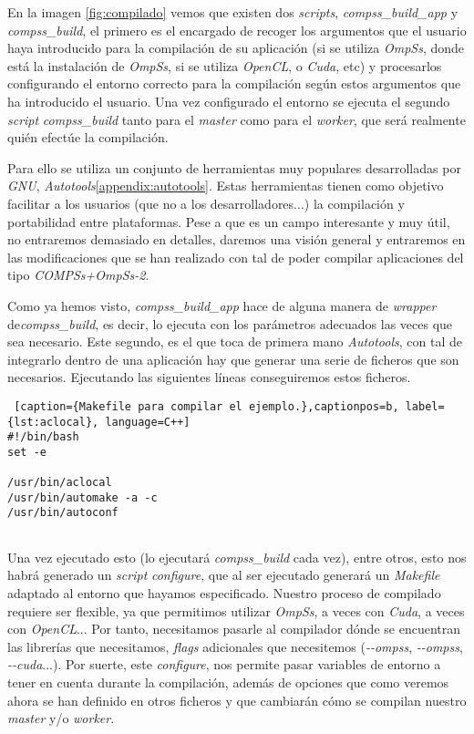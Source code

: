 En la imagen \ref{fig:compilado} vemos que existen dos \textit{scripts}, \textit{compss\_build\_app} y \textit{compss\_build}, el primero es el encargado de recoger los argumentos que el usuario haya introducido para la compilación de su aplicación (si se utiliza \textit{OmpSs}, donde está la instalación de \textit{OmpSs}, si se utiliza \textit{OpenCL}, o \textit{Cuda}, etc) y procesarlos configurando el entorno correcto para la compilación según estos argumentos que ha introducido el usuario. Una vez configurado el entorno se ejecuta el segundo \textit{script} \textit{compss\_build} tanto para el \textit{master} como para el \textit{worker}, que será realmente quién efectúe la compilación. 
\par\bigskip
Para ello se utiliza un conjunto de herramientas muy populares desarrolladas por \textit{GNU},  \textit{Autotools}\ref{appendix:autotools}. Estas herramientas tienen como objetivo facilitar a los usuarios (que no a los desarrolladores...) la compilación y portabilidad entre plataformas. Pese a que es un campo interesante y muy útil, no entraremos demasiado en detalles, daremos una visión general y entraremos en las modificaciones que se han realizado con tal de poder compilar aplicaciones del tipo \textit{COMPSs+OmpSs-2}. 
\par\bigskip
Como ya hemos visto, \textit{compss\_build\_app} hace de alguna manera de \textit{wrapper} de\textit{compss\_build}, es decir, lo ejecuta con los parámetros adecuados las veces que sea necesario. Este segundo, es el que toca de primera mano \textit{Autotools}, con tal de integrarlo dentro de una aplicación hay que generar una serie de ficheros que son necesarios. Ejecutando las siguientes líneas conseguiremos estos ficheros.

\begin{lstlisting} [caption={Makefile para compilar el ejemplo.},captionpos=b, label={lst:aclocal}, language=C++]                                                                                                                                               
#!/bin/bash
set -e

/usr/bin/aclocal
/usr/bin/automake -a -c
/usr/bin/autoconf
       
\end{lstlisting}

Una vez ejecutado esto (lo ejecutará \textit{compss\_build} cada vez), entre otros, esto nos habrá generado un \textit{script} \textit{configure}, que al ser ejecutado generará un \textit{Makefile} adaptado al entorno que hayamos especificado. Nuestro proceso de compilado requiere ser flexible, ya que permitimos utilizar \textit{OmpSs}, a veces con \textit{Cuda}, a veces con \textit{OpenCL}... Por tanto, necesitamos pasarle al compilador dónde se encuentran las librerías que necesitamos, \textit{flags} adicionales que necesitemos (\textit{-{}-ompss}, \textit{-{}-ompss}, \textit{-{}-cuda}...). Por suerte, este \textit{configure}, nos permite pasar variables de entorno a tener en cuenta durante la compilación, además de opciones que como veremos ahora se han definido en otros ficheros y que cambiarán cómo se compilan nuestro \textit{master} y/o \textit{worker}.
\par\bigskip

